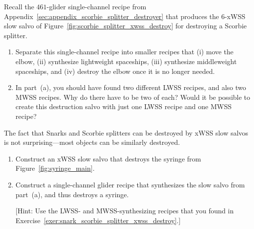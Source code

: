 \begin{multicols}{2}
	
	\mfilbreak
	
	
	\begin{problem}\label{exer:snark_scorbie_splitter_xwss_destroy} 
		Recall the $461$-glider single-channel recipe from Appendix~\ref{sec:appendix_scorbie_splitter_destroyer} that produces the $6$-xWSS slow salvo of Figure~\ref{fig:scorbie_splitter_xwss_destroy} for destroying a Scorbie splitter.
		
		\begin{enumerate}[label=\bf\color{ocre}(\alph*)]
			\item Separate this single-channel recipe into smaller recipes that (i) move the elbow, (ii) synthesize lightweight spaceships, (iii) synthesize middleweight spaceships, and (iv) destroy the elbow once it is no longer needed.
			
			\item In part~(a), you should have found two different LWSS recipes, and also two MWSS recipes. Why do there have to be two of each? Would it be possible to create this destruction salvo with just one LWSS recipe and one MWSS recipe?
		\end{enumerate}
	\end{problem}
	
	
	\mfilbreak
	
	
	\begin{problem}\label{exer:syringe_xwss_destroy} 
		The fact that Snarks and Scorbie splitters can be destroyed by xWSS slow salvos is not surprising---most objects can be similarly destroyed.\smallskip
		
		\begin{enumerate}[label=\bf\color{ocre}(\alph*)]
			\item Construct an xWSS slow salvo that destroys the syringe from Figure~\ref{fig:syringe_main}.
			
			\item Construct a single-channel glider recipe that synthesizes the slow salvo from part~(a), and thus destroys a syringe.
			
			[Hint: Use the LWSS- and MWSS-synthesizing recipes that you found in Exercise~\ref{exer:snark_scorbie_splitter_xwss_destroy}.]
		\end{enumerate}
	\end{problem}
	
	
	\mfilbreak
	

\end{multicols}
